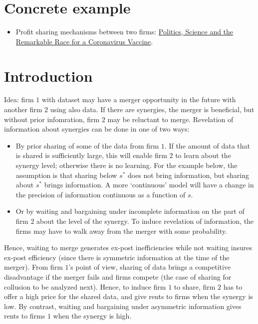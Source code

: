 \documentclass[a4paper]{article}
\begin{document}
\section{Concrete example}

\begin{itemize}
    \item Profit sharing mechanisms between two firms: \href{https://www.nytimes.com/2020/11/21/us/politics/coronavirus-vaccine.html?referringSource=articleShare}{Politics, Science and the Remarkable Race for a Coronavirus Vaccine}.
    
\end{itemize}





\section{Introduction}
Idea: firm $1$ with dataset may have a merger opportunity in the future with another firm $2$ using also data. If there are synergies, the merger is beneficial, but without prior infomration, firm $2$ may be reluctant to merge. Revelation of information about synergies can be done in one of two ways:
\begin{itemize}
  \item By prior sharing of some of the data from firm $1$. If the amount of data that is shared is sufficiently large, this will enable firm $2$ to learn about the synergy level; otherwise there is no learning. For the example below, the assumption is that sharing below $s^*$ does not bring information, but sharing about $s^*$ brings information. A more `continuous' model will have a change in the precision of information continuous as a function of $s$.
  \item Or by waiting and bargaining under incomplete information on the part of firm $2$ about the level of the synergy. To induce revelation of information, the firms may have to walk away from the merger with some probability.
\end{itemize}
Hence, waiting to merge generates ex-post inefficiencies while not waiting insures ex-post efficiency (since there is symmetric information at the time of the merger). From firm $1$'s point of view, sharing of data brings a competitive disadvantage if the merger fails and firms compete (the case of sharing for collusion to be analyzed next). Hence, to induce firm $1$ to share, firm $2$ has to offer a high price for the shared data, and give rents to firms when the synergy is low. By contrast, waiting and bargaining under asymmetric information gives rents to firms $1$ when the synergy is high.
\end{document}
